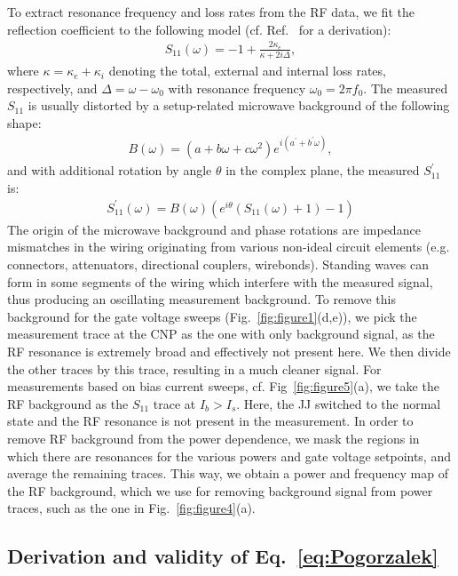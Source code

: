 To extract resonance frequency and loss rates from the RF data, we fit the reflection coefficient to the following model (cf. Ref.~\cite{bosmanBroadbandArchitectureGalvanically2015c} for a derivation):
%
\begin{align}
S_{11}(\omega) = -1+\frac{2\kappa_e}{\kappa+2i\Delta},
\end{align}
%
where $\kappa=\kappa_e+\kappa_i$ denoting the total, external and internal loss rates, respectively, and $\Delta=\omega-\omega_0$ with resonance frequency $\omega_0=2\pi f_0$.
%
The measured $S_{11}$ is usually distorted by a setup-related microwave background of the following shape:
\begin{align}
B(\omega) = \left(a+b\omega+c\omega^2\right)e^{i\left(a^\prime+b^\prime\omega\right)},
\end{align}
%
and with additional rotation by angle $\theta$ in the complex plane, the measured $S_{11}^\prime$ is:
\begin{align}
S_{11}^\prime(\omega)=B(\omega)\left(e^{i\theta}\left(S_{11}(\omega)+1\right)-1\right)
\end{align}
%
The origin of the microwave background and phase rotations are impedance mismatches in the wiring originating from various non-ideal circuit elements (e.g. connectors, attenuators, directional couplers, wirebonds).
%
Standing waves can form in some segments of the wiring which interfere with the measured signal, thus producing an oscillating measurement background.
%
To remove this background for the gate voltage sweeps (Fig.~\ref{fig:figure1}(d,e)), we pick the measurement trace at the CNP as the one with only background signal, as the RF resonance is extremely broad and effectively not present here.
%
We then divide the other traces by this trace, resulting in a much cleaner signal.
%
For measurements based on bias current sweeps, cf. Fig~\ref{fig:figure5}(a), we take the RF background as the $S_{11}$ trace at $I_b>I_s$.
%
Here, the JJ switched to the normal state and the RF resonance is not present in the measurement.
%
In order to remove RF background from the power dependence, we mask the regions in which there are resonances for the various powers and gate voltage setpoints, and average the remaining traces.
%
This way, we obtain a power and frequency map of the RF background, which we use for removing background signal from power traces, such as the one in Fig.~\ref{fig:figure4}(a).

\subsection{Derivation and validity of Eq.~\ref{eq:Pogorzalek}}\label{sec:validity}

